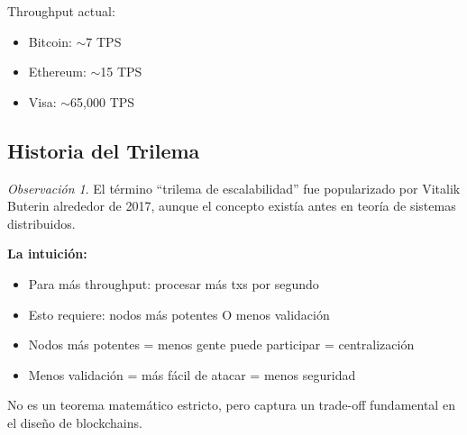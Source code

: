 \documentclass[11pt,a4paper,twoside,openright]{book}
\theoremstyle{definition}
\theoremstyle{plain}
\theoremstyle{remark}
\newtheorem{remark}{Observación}[chapter]
\begin{document}
Throughput actual:
\begin{itemize}
    \item Bitcoin: $\sim$7 TPS
    \item Ethereum: $\sim$15 TPS
    \item Visa: $\sim$65,000 TPS
\end{itemize}

\subsection{Historia del Trilema}

\begin{remark}
El término ``trilema de escalabilidad'' fue popularizado por Vitalik Buterin alrededor de 2017, aunque el concepto existía antes en teoría de sistemas distribuidos.

\textbf{La intuición:}
\begin{itemize}
    \item Para más throughput: procesar más txs por segundo
    \item Esto requiere: nodos más potentes O menos validación
    \item Nodos más potentes = menos gente puede participar = centralización
    \item Menos validación = más fácil de atacar = menos seguridad
\end{itemize}

No es un teorema matemático estricto, pero captura un trade-off fundamental en el diseño de blockchains.
\end{remark}

\begin{center}
\end{center}
\end{document}
